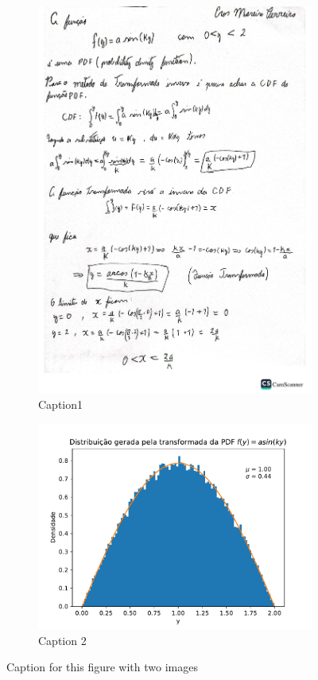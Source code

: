 \documentclass[12pt]{article}
\begin{document}
\begin{figure}[h]

\begin{subfigure}{0.5\textwidth}
\includegraphics[width=0.9\linewidth]{transformada_inversa.pdf} 
\caption{Caption1}
\label{fig:subim1}
\end{subfigure}
\begin{subfigure}{0.5\textwidth}
\includegraphics[width=0.9\linewidth]{transformada_seno.pdf}
\caption{Caption 2}
\label{fig:subim2}
\end{subfigure}

\caption{Caption for this figure with two images}
\label{fig:image2}
\end{figure}
\end{document}
